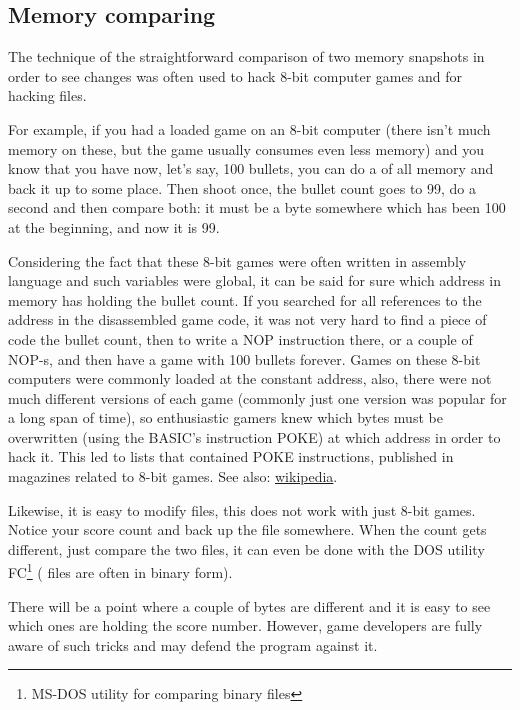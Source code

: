 \subsection{Memory  comparing}
\label{snapshots_comparing}

The technique of the straightforward comparison of two memory snapshots in order to see changes was often used to hack
8-bit computer games and for hacking  files.

For example, if you had a loaded game on an 8-bit computer (there isn't much memory on these, but the game usually
consumes even less memory) and you know that you have now, let's say, 100 bullets, you can do a 
of all memory and back it up to some place. Then shoot once, the bullet count goes to 99, do a second 
and then compare both: it must be a byte somewhere which has been 100 at the beginning, and now it is 99.

Considering the fact that these 8-bit games were often written in assembly language and such variables were global,
it can be said for sure which address in memory has holding the bullet count. If you searched for all references to the
address in the disassembled game code, it was not very hard to find a piece of code  the bullet count,
then to write a \gls{NOP} instruction there, or a couple of \gls{NOP}-s, 
and then have a game with 100 bullets forever.
Games on these 8-bit computers were commonly loaded at the constant
address, also, there were not much different versions of each game (commonly just one version was popular for a long span of time),
so enthusiastic gamers knew which bytes must be overwritten (using the BASIC's instruction \gls{POKE}) at which address in
order to hack it. This led to  lists that contained \gls{POKE} instructions, published in magazines related to
8-bit games. See also: \href{http://go.yurichev.com/17114}{wikipedia}.


Likewise, it is easy to modify  files, this does not work with just 8-bit games. Notice 
your score count and back up the file somewhere. When the  count gets different, just compare the two files,
it can even be done with the DOS utility FC\footnote{MS-DOS utility for comparing binary files} ( files
are often in binary form).

There will be a point where a couple of bytes are different and it is easy to see which ones are
holding the score number.
However, game developers are fully aware of such tricks and may defend the program against it.

